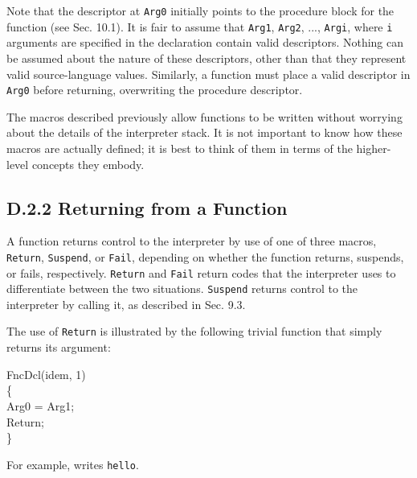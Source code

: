 Note that the descriptor at \texttt{Arg0} initially points to the procedure
block for the function (see Sec. 10.1). It is fair to assume that
\texttt{Arg1}, \texttt{Arg2}, ..., \texttt{Argi}, where \texttt{i}
arguments are specified in the declaration contain valid descriptors.
Nothing can be assumed about the nature of these descriptors, other than
that they represent valid source-language values. Similarly, a function
must place a valid descriptor in \texttt{Arg0} before returning,
overwriting the procedure descriptor.

The macros described previously allow functions to be written without
worrying about the details of the interpreter stack. It is not
important to know how these macros are actually defined; it is best to
think of them in terms of the higher-level concepts they embody.

\subsection[D.2.2 Returning from a Function]{D.2.2 Returning from a Function}

A function returns control to the interpreter by use of one of three macros,
\texttt{Return}, \texttt{Suspend}, or \texttt{Fail}, depending on whether the
function returns, suspends, or fails, respectively. \texttt{Return} and
\texttt{Fail} return codes that the interpreter uses to differentiate between
the two situations. \texttt{Suspend} returns control to the interpreter by
calling it, as described in Sec. 9.3.

The use of \texttt{Return} is illustrated by the following trivial function
that simply returns its argument:
\goodbreak
\begin{iconcode}
\color{red}FncDcl(idem, 1)\\
\{\\
\>Arg0 = Arg1;\\
\>Return;\\
\}
\end{iconcode}
\noindent
For example,
\noindent writes \texttt{hello}.

